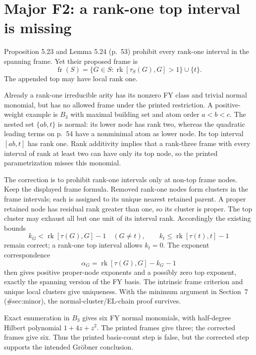 \documentclass[10pt]{article}
\begin{document}
\section*{Major F2: a rank-one top interval is missing}
Proposition 5.23 and Lemma 5.24 (p. 53) prohibit every rank-one interval in the spanning frame. Yet their proposed frame is \[\operatorname{fr}(S)
 =\{G\in S:\operatorname{rk}[\tau_S(G),G]>1\}\cup\{t\}.\] The appended top may have local rank one.\par
Already a rank-one irreducible arity has its nonzero FY class and trivial normal monomial, but has no allowed frame under the printed restriction. A positive-weight example is \(B_3\) with maximal building set and atom order \(a<b<c\). The nested set \(\{ab,t\}\) is normal: its lower node has rank two, whereas the quadratic leading terms on p. 54 have a nonminimal atom as lower node. Its top interval \([ab,t]\) has rank one. Rank additivity implies that a rank-three frame with every interval of rank at least two can have only its top node, so the printed parametrization misses this monomial.\par
The correction is to prohibit rank-one intervals only at non-top frame nodes. Keep the displayed frame formula. Removed rank-one nodes form clusters in the frame intervals; each is assigned to its unique nearest retained parent. A proper retained node has residual rank greater than one, so its cluster is proper. The top cluster may exhaust all but one unit of its interval rank. Accordingly the existing bounds \[k_G<\operatorname{rk}[\tau(G),G]-1\quad(G\ne t),\qquad
 k_t\leq\operatorname{rk}[\tau(t),t]-1\] remain correct; a rank-one top interval allows \(k_t=0\). The exponent correspondence \[\alpha_G=\operatorname{rk}[\tau(G),G]-k_G-1\] then gives positive proper-node exponents and a possibly zero top exponent, exactly the spanning version of the FY basis. The intrinsic frame criterion and unique local clusters give uniqueness. With the minimum argument in Section 7 (\#sec:minor), the normal-cluster/EL-chain proof survives.\par
Exact enumeration in \(B_3\) gives six FY normal monomials, with half-degree Hilbert polynomial \(1+4z+z^2\). The printed frames give three; the corrected frames give six. Thus the printed basis-count step is false, but the corrected step supports the intended Gröbner conclusion.\par
\end{document}
